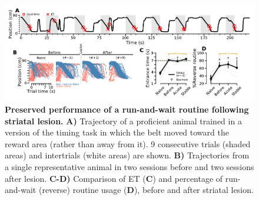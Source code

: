 \begin{figure}[bth!]
	\begin{center}
		\includegraphics[width=\textwidth]{ch-lesion/figures/ReverseTreadmill.pdf}
		\caption
		{\textbf{Preserved performance of a run-and-wait routine following striatal lesion.}
		\textbf{A)} Trajectory of a proficient animal trained in a version of the timing task in which the belt moved toward the reward area (rather than away from it).
		9 consecutive trials (shaded areas) and intertrials (white areas) are shown.
		\textbf{B)} Trajectories from a single representative animal in two sessions before and two sessions after lesion.
		\textbf{C-D)} Comparison of ET (\textbf{C}) and percentage of run-and-wait (reverse) routine usage (\textbf{D}), before and after striatal lesion.
		}
		\label{fig:lesion:rev}
	\end{center}
\end{figure}